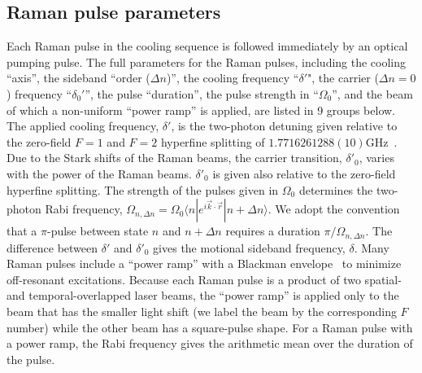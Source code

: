 \documentclass[aps,secnumarabic,amsmath,amssymb]{revtex4}
\begin{document}
\subsection{Raman pulse parameters}
Each Raman pulse in the cooling sequence is followed immediately by an optical pumping
pulse.
The full parameters for the Raman pulses, including the cooling ``axis'', the sideband ``order ($\Delta n$)'', the cooling frequency ``$\delta '$", the carrier ($\Delta n=0$) frequency ``$\delta_0'$'', the pulse ``duration'', the pulse strength in ``$\Omega_0$'', and the beam of which a non-uniform ``power ramp'' is applied,   are listed in 9 groups below.
The applied cooling frequency, $\delta'$,  is the two-photon detuning given relative to the zero-field $F=1$ and $F=2$ hyperfine splitting
of $1.7716261288(10)$GHz~\cite{SteckNa}.
Due to the Stark shifts of the Raman beams, the carrier transition, $\delta'_0$, varies with the power of the Raman beams. $\delta'_0$ is given also relative to the zero-field hyperfine splitting.
The strength of the pulses given in $\Omega_0$ determines the two-photon Rabi frequency, $\Omega_{n,\Delta n}=\Omega_0 \langle n|e^{i \vec{k} \cdot \vec{r}}|n+\Delta n\rangle$.
We adopt the convention that a $\pi$-pulse between state $n$ and $n+\Delta n$ requires a duration $\pi/\Omega_{n,\Delta n}$.
 The difference between $\delta'$ and $\delta'_0$ gives the motional sideband frequency, $\delta$.
Many Raman pulses include a ``power ramp'' with a Blackman envelope~\cite{Kasevich1992} to minimize off-resonant excitations.
Because each Raman pulse is a product of two spatial- and temporal-overlapped laser beams, the ``power ramp'' is applied only to the beam that has the smaller light shift (we label the beam by the corresponding $F$ number) while the other beam has a square-pulse shape.
For a Raman pulse with a power ramp,
the Rabi frequency gives the arithmetic mean over the duration of the pulse.

\newpage
\end{document}
